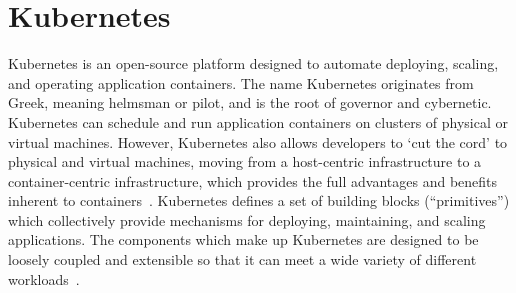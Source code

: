 \section{Kubernetes}

Kubernetes is an open-source platform designed to automate deploying, scaling, and operating application containers. The name Kubernetes originates from Greek, meaning helmsman or pilot, and is the root of governor and cybernetic. Kubernetes can schedule and run application containers on clusters of physical or virtual machines. However, Kubernetes also allows developers to ‘cut the cord’ to physical and virtual machines, moving from a host-centric infrastructure to a container-centric infrastructure, which provides the full advantages and benefits inherent to containers~\cite{hid-sp18-510-web-Kubernetes}. Kubernetes defines a set of building blocks (``primitives'') which collectively provide mechanisms for deploying, maintaining, and scaling applications. The components which make up Kubernetes are designed to be loosely coupled and extensible so that it can meet a wide variety of different workloads~\cite{hid-sp18-510-wiki-Kubernetes}.
